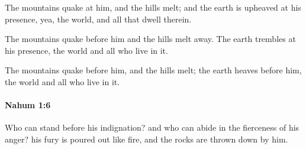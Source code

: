 			\begin{versebox}
					\item[BHS] 
					\item[LXX] 
					\item[ASV] The mountains quake at him, and the hills melt; and the earth is upheaved at his presence, yea, the world, and all that dwell therein.
					\item[NIV] The mountains quake before him and the hills melt away. The earth trembles at his presence, the world and all who live in it.
					\item[NRSV] The mountains quake before him, and the hills melt; the earth heaves before him, the world and all who live in it.
			\end{versebox}

		\paragraph{Nahum 1:6} %
			\label{NAHUM-1-6}

			Who can stand before his indignation? and who can abide in the fierceness of his anger? his fury is poured out like fire, and the rocks are thrown down by him.

